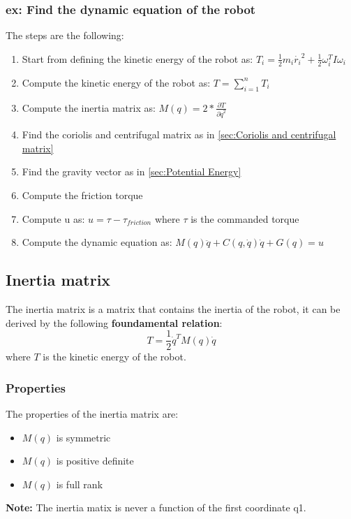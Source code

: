 \documentclass[a4paper,12pt]{article}
\begin{document}
\subsubsection{ex: Find the dynamic equation of the robot}\label{sec:find the dynamic equation of the robot}
The steps are the following:
\begin{enumerate}
    \item Start from defining the kinetic energy of the robot
     as: $T_i = \frac{1}{2} m_i \dot{r_i}^2 + \frac{1}{2} \omega_i^T I \omega_i$
     \item Compute the kinetic energy of the robot as: $T = \sum_{i=1}^{n} T_i$
     \item Compute the inertia matrix as: $M(q) = 2*\frac{\partial T}{\partial \dot{q}^2}$
     \item Find the coriolis and centrifugal matrix as in \ref{sec:Coriolis and centrifugal matrix}
     \item Find the gravity vector as in \ref{sec:Potential Energy}
     \item Compute the friction torque  
     \item Compute u as: $u = \tau - \tau_{friction}$ where $\tau$ is the commanded torque
     \item Compute the dynamic equation as: $M(q) \ddot{q} + C(q, \dot{q}) \dot{q} + G(q) =u$
\end{enumerate}
\subsection{Inertia matrix} \label{sec:Inertia matrix}
The inertia matrix is a matrix that contains the inertia of the robot, it can be derived by the 
following \textbf{foundamental relation}:
\begin{equation}
    T= \frac{1}{2} \dot{q}^T M(q) \dot{q}
\end{equation}
where $T$ is the kinetic energy of the robot. 
\subsubsection{Properties}
The properties of the inertia matrix are:
\begin{itemize}
    \item $M(q)$ is symmetric
    \item $M(q)$ is positive definite
    \item $M(q)$ is full rank
\end{itemize}
\textbf{Note:} The inertia matix is never a function of the first coordinate q1.
\end{document}
